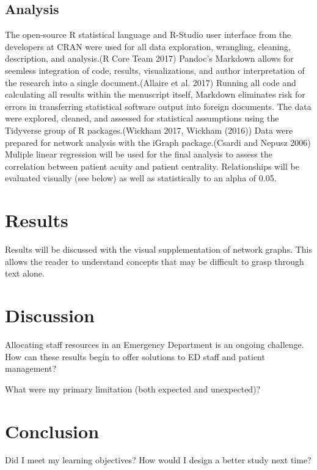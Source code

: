 \documentclass[]{elsarticle} %
\begin{document}
\subsection{Analysis}\label{analysis}

The open-source R statistical language and R-Studio user interface from
the developers at CRAN were used for all data exploration, wrangling,
cleaning, description, and analysis.(R Core Team 2017) Pandoc's Markdown
allows for seemless integration of code, results, visualizations, and
author interpretation of the research into a single document.(Allaire et
al. 2017) Running all code and calculating all results within the
menuscript itself, Markdown eliminates risk for errors in transferring
statistical software output into foreign documents. The data were
explored, cleaned, and assessed for statistical assumptions using the
Tidyverse group of R packages.(Wickham 2017, Wickham (2016)) Data were
prepared for network analysis with the iGraph package.(Csardi and Nepusz
2006) Muliple linear regression will be used for the final analysis to
assess the correlation between patient acuity and patient centrality.
Relationships will be evaluated visually (see below) as well as
statistically to an alpha of 0.05.

\section{Results}\label{results}

Results will be discussed with the visual supplementation of network
graphs. This allows the reader to understand concepts that may be
difficult to grasp through text alone.

\section{Discussion}\label{discussion}

Allocating staff resources in an Emergency Department is an ongoing
challenge. How can these results begin to offer solutions to ED staff
and patient management?

What were my primary limitation (both expected and unexpected)?

\section{Conclusion}\label{conclusion}

Did I meet my learning objectives? How would I design a better study
next time?
\end{document}
